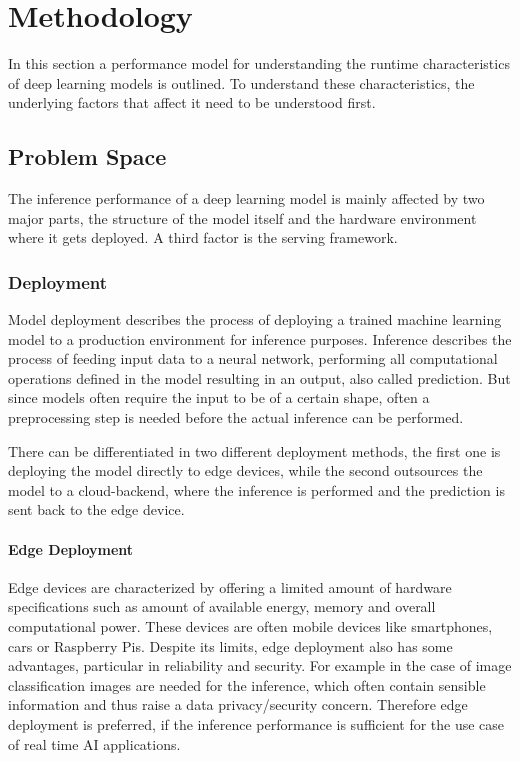 \chapter{Methodology}
\label{chap:methodology}
In this section a performance model for understanding the runtime characteristics of deep learning models is outlined. To understand these characteristics, the underlying factors that affect it need to be understood first. 


\section{Problem Space}
The inference performance of a deep learning model is mainly affected by two major parts, the structure of the model itself and the hardware environment where it gets deployed. A third factor is the serving framework.

\subsection{Deployment}
Model deployment describes the process of deploying a trained machine learning model to a production environment for inference purposes. 
Inference describes the process of feeding input data to a neural network, performing all computational operations defined in the model resulting in an output, also called prediction.
But since models often require the input to be of a certain shape, often a preprocessing step is needed before the actual inference can be performed.

There can be differentiated in two different deployment methods, the first one is deploying the model directly to edge devices, while the second outsources the model to a cloud-backend, where the inference is performed and the prediction is sent back to the edge device.
\subsubsection{Edge Deployment}
Edge devices are characterized by offering a limited amount of hardware specifications such as amount of available energy, memory and overall computational power.
These devices are often mobile devices like smartphones, cars or Raspberry Pis.
Despite its limits, edge deployment also has some advantages, particular in reliability and security. 
For example in the case of image classification images are needed for the inference, which often contain sensible information and thus raise a data privacy/security concern.
Therefore edge deployment is preferred, if the inference performance is sufficient for the use case of real time AI applications.

